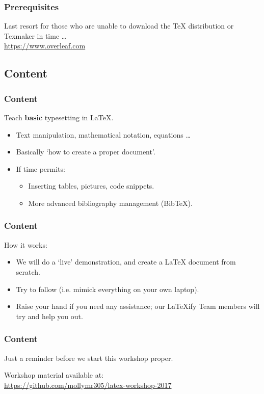 \documentclass{beamer}
\begin{document}
    \begin{frame}
        \frametitle{Prerequisites}
        \begin{center}
            Last resort for those who are unable to download the \TeX{} distribution or Texmaker in time \dots\\[3mm]
            \url{https://www.overleaf.com}
        \end{center}
    \end{frame}

    \subsection{Content}
    \begin{frame}
        \frametitle{Content}
        Teach \textbf{basic} typesetting in \LaTeX.
        \begin{itemize}
            \item Text manipulation, mathematical notation, equations \dots
            \item Basically `how to create a proper document'.
            \item If time permits:
            \begin{itemize}
                \item Inserting tables, pictures, code snippets.
                \item More advanced bibliography management (BibTeX).
            \end{itemize}
        \end{itemize}
    \end{frame}

    \begin{frame}
        \frametitle{Content}
        How it works:
        \begin{itemize}
            \item We will do a `live' demonstration, and create a \LaTeX{} document from scratch.
            \item Try to follow (i.e. mimick everything on your own laptop).
            \item Raise your hand if you need any assistance; our \LaTeX{}ify Team members will try and help you out.
        \end{itemize}
    \end{frame}

    \begin{frame}
        \frametitle{Content}
        Just a reminder before we start this workshop proper.
        \begin{center}
            Workshop material available at:\\[3mm]
            \url{https://github.com/mollymr305/latex-workshop-2017}
        \end{center}        
    \end{frame}
\end{document}
